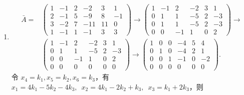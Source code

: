 \begin{enumerate}
    \item \begin{align*}
              \bar{A} ={} &
              \begin{pmatrix}
                  1 & -1 & 2 & -2  & 3  & 1  \\
                  2 & -1 & 5 & -9  & 8  & -1 \\
                  3 & -2 & 7 & -11 & 11 & 0  \\
                  1 & -1 & 1 & -1  & 3  & 3
              \end{pmatrix}
              \rightarrow
              \begin{pmatrix}
                  1 & -1 & 2  & -2 & 3 & 1  \\
                  0 & 1  & 1  & -5 & 2 & -3 \\
                  0 & 1  & 1  & -5 & 2 & -3 \\
                  0 & 0  & -1 & 1  & 0 & 2
              \end{pmatrix} \rightarrow \\
                          &
              \begin{pmatrix}
                  1 & -1 & 2  & -2 & 3 & 1  \\
                  0 & 1  & 1  & -5 & 2 & -3 \\
                  0 & 0  & -1 & 1  & 0 & 2  \\
                  0 & 0  & 0  & 0  & 0 & 0
              \end{pmatrix}
              \rightarrow
              \begin{pmatrix}
                  1 & 0 & 0 & -4 & 5 & 4  \\
                  0 & 1 & 0 & -4 & 2 & 1  \\
                  0 & 0 & 1 & -1 & 0 & -2 \\
                  0 & 0 & 0 & 0  & 0 & 0
              \end{pmatrix}.
          \end{align*}
          令 $ x_4 = k_1, x_5 = k_2, x_6 = k_3$，有 $x_1 = 4k_1 - 5k_2 - 4k_3,\enspace\allowbreak x_2 = 4k_1 - 2k_2 + k_3,\enspace\allowbreak x_3 = k_1 + 2k_3 $，则

\end{enumerate}
